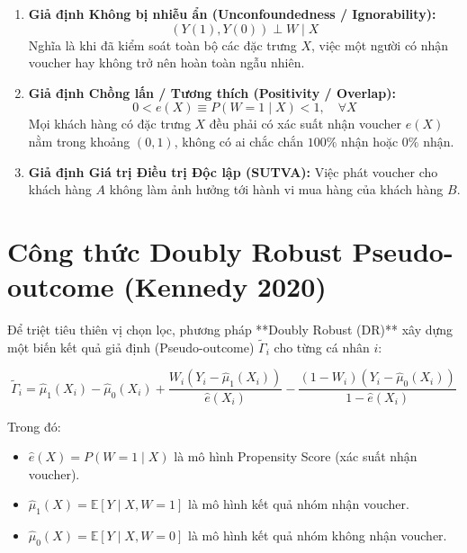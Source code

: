 \begin{enumerate}[leftmargin=*]
    \item \textbf{Giả định Không bị nhiễu ẩn (Unconfoundedness / Ignorability):}
    \begin{equation}
        (Y(1), Y(0)) \perp W \mid X
    \end{equation}
    Nghĩa là khi đã kiểm soát toàn bộ các đặc trưng $X$, việc một người có nhận voucher hay không trở nên hoàn toàn ngẫu nhiên.

    \item \textbf{Giả định Chồng lấn / Tương thích (Positivity / Overlap):}
    \begin{equation}
        0 < e(X) \equiv P(W=1 \mid X) < 1, \quad \forall X
    \end{equation}
    Mọi khách hàng có đặc trưng $X$ đều phải có xác suất nhận voucher $\hat{e}(X)$ nằm trong khoảng $(0, 1)$, không có ai chắc chắn $100\%$ nhận hoặc $0\%$ nhận.

    \item \textbf{Giả định Giá trị Điều trị Độc lập (SUTVA):}
    Việc phát voucher cho khách hàng $A$ không làm ảnh hưởng tới hành vi mua hàng của khách hàng $B$.
\end{enumerate}

\section{Công thức Doubly Robust Pseudo-outcome (Kennedy 2020)}

Để triệt tiêu thiên vị chọn lọc, phương pháp **Doubly Robust (DR)** xây dựng một biến kết quả giả định (Pseudo-outcome) $\tilde{\Gamma}_i$ cho từng cá nhân $i$:

\begin{equation}
    \tilde{\Gamma}_i = \hat{\mu}_1(X_i) - \hat{\mu}_0(X_i) + \frac{W_i (Y_i - \hat{\mu}_1(X_i))}{\hat{e}(X_i)} - \frac{(1-W_i)(Y_i - \hat{\mu}_0(X_i))}{1 - \hat{e}(X_i)}
\end{equation}

Trong đó:
\begin{itemize}
    \item $\hat{e}(X) = P(W=1 \mid X)$ là mô hình Propensity Score (xác suất nhận voucher).
    \item $\hat{\mu}_1(X) = \mathbb{E}[Y \mid X, W=1]$ là mô hình kết quả nhóm nhận voucher.
    \item $\hat{\mu}_0(X) = \mathbb{E}[Y \mid X, W=0]$ là mô hình kết quả nhóm không nhận voucher.
\end{itemize}


